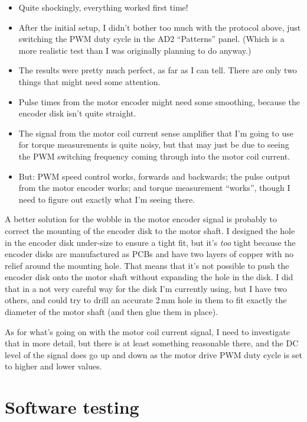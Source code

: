 \documentclass[a4paper,11pt]{article}
\begin{document}
\begin{itemize}
  \item{Quite shockingly, everything worked first time!}
  \item{After the initial setup, I didn't bother too much with the
    protocol above, just switching the PWM duty cycle in the AD2
    ``Patterns'' panel. (Which is a more realistic test than I was
    originally planning to do anyway.)}
  \item{The results were pretty much perfect, as far as I can tell.
    There are only two things that might need some attention.}
  \item{Pulse times from the motor encoder might need some smoothing,
    because the encoder disk isn't quite straight.}
  \item{The signal from the motor coil current sense amplifier that
    I'm going to use for torque measurements is quite noisy, but that
    may just be due to seeing the PWM switching frequency coming
    through into the motor coil current.}
  \item{But: PWM speed control works, forwards and backwards; the
    pulse output from the motor encoder works; and torque measurement
    ``works'', though I need to figure out exactly what I'm seeing
    there.}
\end{itemize}

A better solution for the wobble in the motor encoder signal is
probably to correct the mounting of the encoder disk to the motor
shaft. I designed the hole in the encoder disk under-size to ensure a
tight fit, but it's \emph{too} tight because the encoder disks are
manufactured as PCBs and have two layers of copper with no relief
around the mounting hole. That means that it's not possible to push
the encoder disk onto the motor shaft without expanding the hole in
the disk. I did that in a not very careful way for the disk I'm
currently using, but I have two others, and could try to drill an
accurate 2\,mm hole in them to fit exactly the diameter of the motor
shaft (and then glue them in place).

As for what's going on with the motor coil current signal, I need to
investigate that in more detail, but there is at least something
reasonable there, and the DC level of the signal does go up and down
as the motor drive PWM duty cycle is set to higher and lower values.

\section{Software testing}
\end{document}

